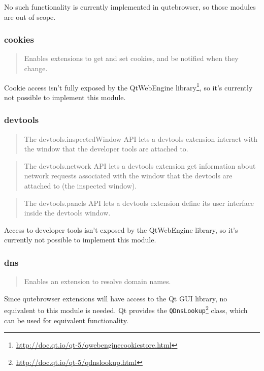\documentclass[a4paper,parskip=full]{scrreprt}
\begin{document}
No such functionality is currently implemented in qutebrowser, so those modules
are out of scope.

\subsubsection{cookies}
\begin{quote}
Enables extensions to get and set cookies, and be notified when they change.
\end{quote}

Cookie access isn't fully exposed by the QtWebEngine
library\footnote{\url{http://doc.qt.io/qt-5/qwebenginecookiestore.html}}, so
it's currently not possible to implement this module.

\subsubsection{devtools}
\begin{quote}
The devtools.inspectedWindow API lets a devtools extension interact with the window that the developer tools are attached to.
\end{quote}

\begin{quote}
The devtools.network API lets a devtools extension get information about network requests associated with the window that the devtools are attached to (the inspected window).
\end{quote}

\begin{quote}
The devtools.panels API lets a devtools extension define its user interface inside the devtools window.
\end{quote}

Access to developer tools isn't exposed by the QtWebEngine library, so it's
currently not possible to implement this module.

\subsubsection{dns}
\begin{quote}
Enables an extension to resolve domain names.
\end{quote}

Since qutebrowser extensions will have access to the Qt GUI library, no
equivalent to this module is needed. Qt provides the
\verb|QDnsLookup|\footnote{\url{http://doc.qt.io/qt-5/qdnslookup.html}} class, which can
be used for equivalent functionality.
\end{document}
